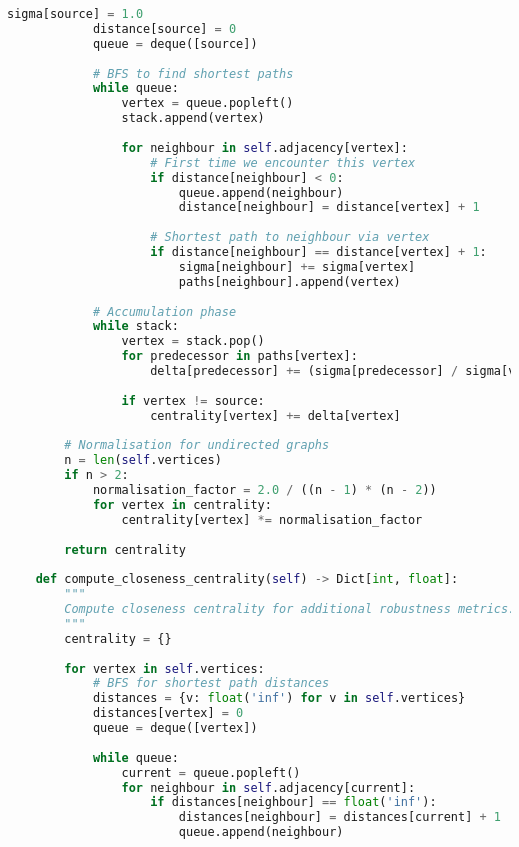 \begin{lstlisting}[language=Python, caption=Complete Graph Structure Analyzer Implementation]
            sigma[source] = 1.0
            distance[source] = 0
            queue = deque([source])
            
            # BFS to find shortest paths
            while queue:
                vertex = queue.popleft()
                stack.append(vertex)
                
                for neighbour in self.adjacency[vertex]:
                    # First time we encounter this vertex
                    if distance[neighbour] < 0:
                        queue.append(neighbour)
                        distance[neighbour] = distance[vertex] + 1
                    
                    # Shortest path to neighbour via vertex
                    if distance[neighbour] == distance[vertex] + 1:
                        sigma[neighbour] += sigma[vertex]
                        paths[neighbour].append(vertex)
            
            # Accumulation phase
            while stack:
                vertex = stack.pop()
                for predecessor in paths[vertex]:
                    delta[predecessor] += (sigma[predecessor] / sigma[vertex]) * (1 + delta[vertex])
                
                if vertex != source:
                    centrality[vertex] += delta[vertex]
        
        # Normalisation for undirected graphs
        n = len(self.vertices)
        if n > 2:
            normalisation_factor = 2.0 / ((n - 1) * (n - 2))
            for vertex in centrality:
                centrality[vertex] *= normalisation_factor
        
        return centrality
    
    def compute_closeness_centrality(self) -> Dict[int, float]:
        """
        Compute closeness centrality for additional robustness metrics.
        """
        centrality = {}
        
        for vertex in self.vertices:
            # BFS for shortest path distances
            distances = {v: float('inf') for v in self.vertices}
            distances[vertex] = 0
            queue = deque([vertex])
            
            while queue:
                current = queue.popleft()
                for neighbour in self.adjacency[current]:
                    if distances[neighbour] == float('inf'):
                        distances[neighbour] = distances[current] + 1
                        queue.append(neighbour)
            

\end{lstlisting}
